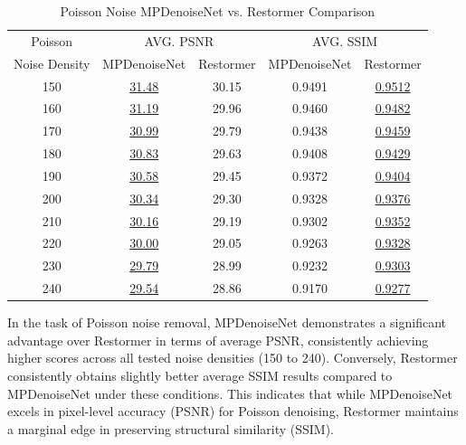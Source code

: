 \begin{table}[H]
    \centering
    \begin{tabular}{ccccc}
        \hline
        Poisson & \multicolumn{2}{c}{AVG. PSNR} & \multicolumn{2}{c}{AVG. SSIM} \\
        Noise Density & MPDenoiseNet & Restormer & MPDenoiseNet & Restormer \\
        \hline
        150 & \underline{31.48} & 30.15 & 0.9491 & \underline{0.9512} \\
        160 & \underline{31.19} & 29.96 & 0.9460 & \underline{0.9482} \\
        170 & \underline{30.99} & 29.79 & 0.9438 & \underline{0.9459} \\
        180 & \underline{30.83} & 29.63 & 0.9408 & \underline{0.9429} \\
        190 & \underline{30.58} & 29.45 & 0.9372 & \underline{0.9404} \\
        200 & \underline{30.34} & 29.30 & 0.9328 & \underline{0.9376} \\
        210 & \underline{30.16} & 29.19 & 0.9302 & \underline{0.9352} \\
        220 & \underline{30.00} & 29.05 & 0.9263 & \underline{0.9328} \\
        230 & \underline{29.79} & 28.99 & 0.9232 & \underline{0.9303} \\
        240 & \underline{29.54} & 28.86 & 0.9170 & \underline{0.9277} \\
        \hline
    \end{tabular}
    \caption{Poisson Noise MPDenoiseNet vs. Restormer Comparison}
\end{table}

In the task of Poisson noise removal, MPDenoiseNet demonstrates a significant advantage over Restormer in terms of average PSNR, consistently achieving higher scores across all tested noise densities (150 to 240). Conversely, Restormer consistently obtains slightly better average SSIM results compared to MPDenoiseNet under these conditions. This indicates that while MPDenoiseNet excels in pixel-level accuracy (PSNR) for Poisson denoising, Restormer maintains a marginal edge in preserving structural similarity (SSIM).